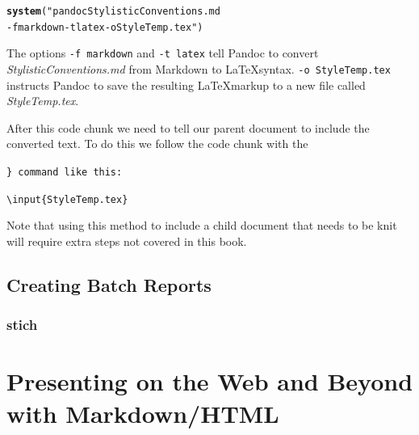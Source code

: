 \documentclass[ChapterTOCs,krantz1]{krantz}\usepackage{graphicx, color}
\makeatletter
\newcommand{\hlfunctioncall}[1]{\textcolor[rgb]{0.501960784313725,0,0.329411764705882}{\textbf{#1}}}%
\newenvironment{kframe}{%
 \def\at@end@of@kframe{}%
 \ifinner\ifhmode%
  \def\at@end@of@kframe{\end{minipage}}%
  \begin{minipage}{\columnwidth}%
 \fi\fi%
 \def\FrameCommand##1{\hskip\@totalleftmargin \hskip-\fboxsep
 \colorbox{shadecolor}{##1}\hskip-\fboxsep
     \hskip-\linewidth \hskip-\@totalleftmargin \hskip\columnwidth}%
 \MakeFramed {\advance\hsize-\width
   \@totalleftmargin\z@ \linewidth\hsize
   \@setminipage}}%
 {\par\unskip\endMakeFramed%
 \at@end@of@kframe}
\newenvironment{knitrout}{}{} %
\makeatother
\begin{document}
\begin{knitrout}
\color{fgcolor}\begin{kframe}
\begin{alltt}
\hlfunctioncall{system}("pandoc StylisticConventions.md
        -f markdown -t latex -o StyleTemp.tex")
\end{alltt}
\end{kframe}
\end{knitrout}


\noindent The options {\tt{-f markdown}} and {\tt{-t latex}} tell Pandoc to convert {\emph{StylisticConventions.md}} from Markdown to \LaTeX syntax. {\tt{-o StyleTemp.tex}} instructs Pandoc to save the resulting \LaTeX markup to a new file called {\emph{StyleTemp.tex}}. 

After this code chunk we need to tell our parent document to include the converted text. To do this we follow the code chunk with the {\tt{\}} command like this:

\begin{knitrout}
\color{fgcolor}\begin{kframe}
\begin{alltt}
\textbackslash{}input\{StyleTemp.tex\}
\end{alltt}
\end{kframe}
\end{knitrout}


\noindent Note that using this method to include a child document that needs to be knit will require extra steps not covered in this book.


\section{Creating Batch Reports}

\subsection{stich}




\chapter{Presenting on the Web and Beyond with Markdown/HTML}
\end{document}
